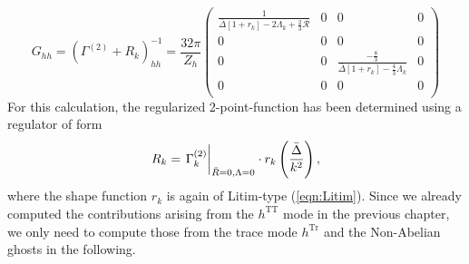 \begin{equation} G_{h h}=\left(\Gamma^{(2)}+R_{k}\right)_{h h}^{-1} = \frac{32\pi}{Z_h}
\begin{pmatrix}
\frac{1}{\bar{\Delta}\left[1+r_{k}\right]-2\Lambda_k+\frac{2}{3}\mathcal{R}} & 0 & 0 & 0 \\[10pt]
0 & 0  & 0 & 0 \\[10pt]
0 & 0 & \frac{-\frac{8}{3}}{\bar{\Delta}\left[1+r_{k}\right]-\frac{4}{3} \Lambda_k}  &0\\[10pt]
0 & 0 & 0 & 0 \\
\end{pmatrix}
\label{eqn:G_hh}
\end{equation}
For this calculation, the regularized 2-point-function has been determined using a regulator of form
\begin{equation}
R_{k}=\eval{\Gamma_{k}^{(2)}}_{\bar{R}=0, \Lambda=0} \cdot r_{k}\left(\frac{\bar{\Delta}}{k^2}\right),
\end{equation}
where the shape function $r_k$ is again of Litim-type (\ref{eqn:Litim}). Since we already computed the contributions arising from the $h^{\mathrm{TT}}$ mode in the previous chapter, we only need to compute those from the trace mode $h^{\mathrm{Tr}}$ and the Non-Abelian ghosts in the following. 


